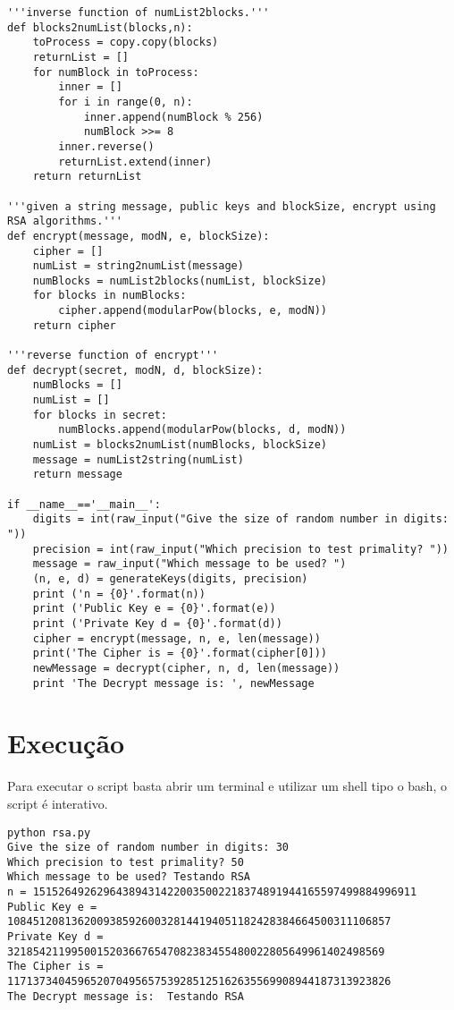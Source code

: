 \documentclass[a4paper,11pt]{article}
\theoremstyle{mytheor}
\begin{document}
\begin{lstlisting}[]
'''inverse function of numList2blocks.'''
def blocks2numList(blocks,n):
    toProcess = copy.copy(blocks)
    returnList = []
    for numBlock in toProcess:
        inner = []
        for i in range(0, n):
            inner.append(numBlock % 256)
            numBlock >>= 8
        inner.reverse()
        returnList.extend(inner)
    return returnList

'''given a string message, public keys and blockSize, encrypt using RSA algorithms.'''
def encrypt(message, modN, e, blockSize):
    cipher = []
    numList = string2numList(message)
    numBlocks = numList2blocks(numList, blockSize)
    for blocks in numBlocks:
        cipher.append(modularPow(blocks, e, modN))
    return cipher

'''reverse function of encrypt'''
def decrypt(secret, modN, d, blockSize):
    numBlocks = []
    numList = []
    for blocks in secret:
        numBlocks.append(modularPow(blocks, d, modN))
    numList = blocks2numList(numBlocks, blockSize)
    message = numList2string(numList)
    return message

if __name__=='__main__':
    digits = int(raw_input("Give the size of random number in digits: "))
    precision = int(raw_input("Which precision to test primality? "))
    message = raw_input("Which message to be used? ")
    (n, e, d) = generateKeys(digits, precision)
    print ('n = {0}'.format(n))
    print ('Public Key e = {0}'.format(e))
    print ('Private Key d = {0}'.format(d))
    cipher = encrypt(message, n, e, len(message))
    print('The Cipher is = {0}'.format(cipher[0]))
    newMessage = decrypt(cipher, n, d, len(message))
    print 'The Decrypt message is: ', newMessage
\end{lstlisting}

\section*{Execução}

Para executar o script basta abrir um terminal e utilizar um shell tipo o bash, o script é interativo.

\begin{lstlisting}[label={list:second},caption=Executando o script.]
python rsa.py 
Give the size of random number in digits: 30
Which precision to test primality? 50
Which message to be used? Testando RSA
n = 151526492629643894314220035002218374891944165597499884996911
Public Key e = 108451208136200938592600328144194051182428384664500311106857
Private Key d = 32185421199500152036676547082383455480022805649961402498569
The Cipher is = 117137340459652070495657539285125162635569908944187313923826
The Decrypt message is:  Testando RSA
\end{lstlisting}
\end{document}
